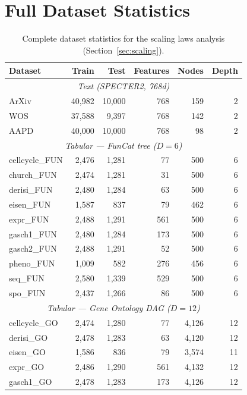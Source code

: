 \appendix
\section{Full Dataset Statistics}
\label{sec:appendix}

\begin{table}[H]
\centering
\caption{Complete dataset statistics for the scaling laws analysis
(Section~\ref{sec:scaling}).}
\label{tab:all_datasets}
\begin{tabular}{lrrrrr}
\toprule
\textbf{Dataset} & \textbf{Train} & \textbf{Test} & \textbf{Features} &
\textbf{Nodes} & \textbf{Depth} \\
\midrule
\multicolumn{6}{c}{\textit{Text (SPECTER2, 768d)}} \\
ArXiv  & 40,982 & 10,000 & 768 & 159 & 2 \\
WOS    & 37,588 & 9,397  & 768 & 142 & 2 \\
AAPD   & 40,000 & 10,000 & 768 & 98  & 2 \\
\midrule
\multicolumn{6}{c}{\textit{Tabular — FunCat tree ($D{=}6$)}} \\
cellcycle\_FUN & 2,476 & 1,281 & 77  & 500 & 6 \\
church\_FUN    & 2,474 & 1,281 & 31  & 500 & 6 \\
derisi\_FUN    & 2,480 & 1,284 & 63  & 500 & 6 \\
eisen\_FUN     & 1,587 & 837   & 79  & 462 & 6 \\
expr\_FUN      & 2,488 & 1,291 & 561 & 500 & 6 \\
gasch1\_FUN    & 2,480 & 1,284 & 173 & 500 & 6 \\
gasch2\_FUN    & 2,488 & 1,291 & 52  & 500 & 6 \\
pheno\_FUN     & 1,009 & 582   & 276 & 456 & 6 \\
seq\_FUN       & 2,580 & 1,339 & 529 & 500 & 6 \\
spo\_FUN       & 2,437 & 1,266 & 86  & 500 & 6 \\
\midrule
\multicolumn{6}{c}{\textit{Tabular — Gene Ontology DAG ($D{=}12$)}} \\
cellcycle\_GO & 2,474 & 1,280 & 77  & 4,126 & 12 \\
derisi\_GO    & 2,478 & 1,283 & 63  & 4,120 & 12 \\
eisen\_GO     & 1,586 & 836   & 79  & 3,574 & 11 \\
expr\_GO      & 2,486 & 1,290 & 561 & 4,132 & 12 \\
gasch1\_GO    & 2,478 & 1,283 & 173 & 4,126 & 12 \\

\end{tabular}
\end{table}
